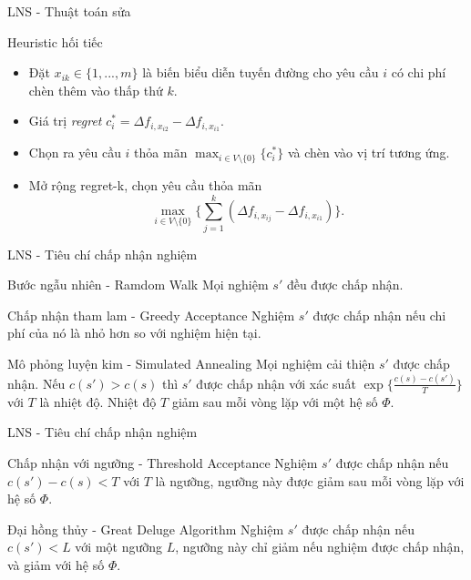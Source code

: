 \begin{frame}{LNS - Thuật toán sửa}
  \begin{block}{Heuristic hối tiếc}
    \begin{itemize}
      \item Đặt $x_{ik} \in \{1, ..., m\}$ là biến biểu diễn tuyến đường cho yêu cầu $i$ có chi phí chèn thêm vào thấp thứ $k$.
      \item Giá trị \textit{regret} $c_i^* = \Delta f_{i, x_{i2}} - \Delta f_{i, x_{i1}}$.
      \item Chọn ra yêu cầu $i$ thỏa mãn $\max_{i \in V \setminus \{0\}} \{c_i^*\}$ và chèn vào vị trí tương ứng.
      \item Mở rộng regret-k, chọn yêu cầu thỏa mãn
      \begin{equation}
        \max\limits_{i \in V \setminus \{0\} } \{ \sum_{j=1}^k (\Delta f_{i, x_{ij}} - \Delta f_{i, x_{i1}}) \}.
    \end{equation}
    \end{itemize}
  \end{block}
\end{frame}

\begin{frame}{LNS - Tiêu chí chấp nhận nghiệm}
    \begin{block}{Bước ngẫu nhiên - Ramdom Walk}
      Mọi nghiệm $s'$ đều được chấp nhận.
    \end{block}
    \begin{block}{Chấp nhận tham lam - Greedy Acceptance}
      Nghiệm $s'$ được chấp nhận nếu chi phí của nó là nhỏ hơn so với nghiệm hiện tại.
    \end{block}
    \begin{block}{Mô phỏng luyện kim - Simulated Annealing}
      Mọi nghiệm cải thiện $s'$ được chấp nhận. Nếu $c(s') > c(s)$ thì $s'$ được chấp nhận với xác suất $\exp \{ \frac{c(s) - c(s')}{T} \}$ với $T$ là nhiệt độ. Nhiệt độ $T$ giảm sau mỗi vòng lặp với một hệ số $\Phi$.
    \end{block}
\end{frame}

\begin{frame}{LNS - Tiêu chí chấp nhận nghiệm}
  \begin{block}{Chấp nhận với ngưỡng - Threshold Acceptance}
    Nghiệm $s'$ được chấp nhận nếu $c(s') - c(s) < T$ với $T$ là ngưỡng, ngưỡng này được giảm sau mỗi vòng lặp với hệ số $\Phi$.
  \end{block}
  
  \begin{block}{Đại hồng thủy - Great Deluge Algorithm}
    Nghiệm $s'$ được chấp nhận nếu $c(s') < L$ với một ngưỡng $L$, ngưỡng này chỉ giảm nếu nghiệm được chấp nhận, và giảm với hệ số $\Phi$.
  \end{block}
\end{frame}

